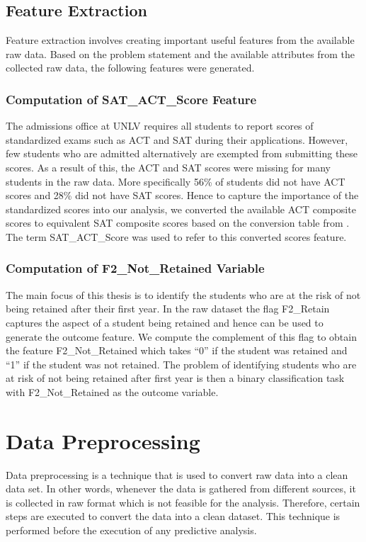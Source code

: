 \documentclass[11pt,openright]{report}
\begin{document}
\subsection{Feature Extraction}
Feature extraction involves creating important useful features from the available raw data. Based on the problem statement and the available attributes from the collected raw data, the following features were generated.

\subsubsection {Computation of SAT\_ACT\_Score Feature}
The admissions office at UNLV requires all students to report scores of standardized exams such as ACT and SAT during their applications. However, few students who are admitted alternatively are exempted from submitting these scores. As a result of this, the ACT and SAT scores were missing for many students in the raw data. More specifically 56\% of students did not have ACT scores and 28\% did not have SAT scores. Hence to capture the importance of the standardized scores into our analysis, we converted the available ACT composite scores to equivalent 
SAT composite scores based on the conversion table from \cite{ACTSAT}. The term SAT\_ACT\_Score was used to refer to this converted scores feature.

\subsubsection {Computation of F2\_Not\_Retained Variable}
The main focus of this thesis is to identify the students who are at the risk of not being retained after their first year. In the raw dataset the flag F2\_Retain captures the aspect of a student being retained and hence can be used to generate the outcome feature. We compute the complement of this flag to obtain the feature F2\_Not\_Retained which takes ``0'' if the student was retained and ``1'' if the student was not retained. The problem of identifying students who are at risk of not being retained after first year is then a binary classification task with F2\_Not\_Retained as the outcome variable.

\section {Data Preprocessing}
Data preprocessing is a technique that is used to convert raw data into a clean data set. In other words, whenever the data is gathered from different sources, it is collected in raw format which is not feasible for the analysis.
Therefore, certain steps are executed to convert the data into a clean dataset. This technique is performed before the execution of any predictive analysis. 
\end{document}
